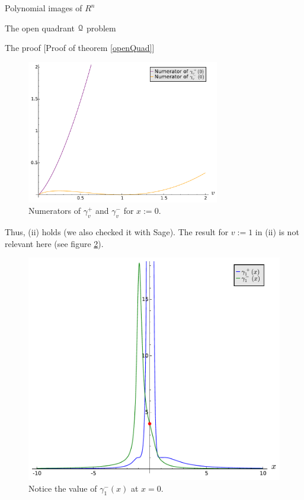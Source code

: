 \documentclass[11pt, a4paper, english, twoside, notitlepage, openright]{report}
\begin{document}
\begin{chapter}{Polynomial images of $R^n$}
\begin{section}{The open quadrant $\mathcal{Q}$ problem}
\begin{subsection}{The proof} [Proof of theorem \ref{openQuad}]
\begin{figure}[h]
\centering
\includegraphics[width=0.75\textwidth]{plots/ch1_08_numerators.pdf}
\caption{Numerators of $\gamma_v^+$ and $\gamma_v^-$ for $x:=0$.\label{fig:numerators}}
\end{figure}
			
Thus, (ii) holds (we also checked it with Sage). The result for $v:=1$ in (ii) is not relevant here (see figure \ref{fig:limit}).
\begin{figure}[h]
\centering
\includegraphics[width=1\textwidth]{plots/ch1_09_limit.pdf}
\caption{Notice the value of $\gamma_1^-(x)$ at $x=0$.\label{fig:limit}}
\end{figure}


\end{subsection}
\end{section}
\end{chapter}
\end{document}
